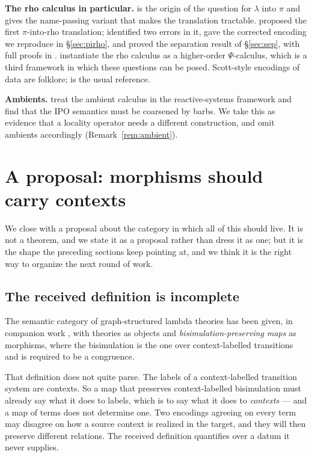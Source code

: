 \documentclass{article}
\begin{document}
\textbf{The rho calculus in particular.} \citet{funproc} is the origin of the question for $\lambda$ into $\pi$ and \citet{boudol} gives the name-passing variant that makes the translation tractable. \citet{rho} proposed the first $\pi$-into-rho translation; \citet{lybech} identified two errors in it, gave the corrected encoding we reproduce in \S\ref{sec:pirho}, and proved the separation result of \S\ref{sec:sep}, with full proofs in \citep{lybech-tr}. \citet{psi-rho} instantiate the rho calculus as a higher-order $\Psi$-calculus, which is a third framework in which these questions can be posed. Scott-style encodings of data are folklore; \citet{mogensen} is the usual reference.

\textbf{Ambients.} \citet{amb-ipo-lts-sos} treat the ambient calculus in the reactive-systems framework and find that the IPO semantics must be coarsened by barbs. We take this as evidence that a locality operator needs a different construction, and omit ambients accordingly (Remark~\ref{rem:ambient}).

\section{A proposal: morphisms should carry contexts}
\label{sec:cat-gslt}

We close with a proposal about the category in which all of this should live. It is not a theorem, and we state it as a proposal rather than dress it as one; but it is the shape the preceding sections keep pointing at, and we think it is the right way to organize the next round of work.

\subsection{The received definition is incomplete}

The semantic category of graph-structured lambda theories has been given, in companion work \citep{probing}, with theories as objects and \emph{bisimulation-preserving maps} as morphisms, where the bisimulation is the one over context-labelled transitions and is required to be a congruence.

That definition does not quite parse. The labels of a context-labelled transition system are contexts. So a map that preserves context-labelled bisimulation must already say what it does to labels, which is to say what it does to \emph{contexts} --- and a map of terms does not determine one. Two encodings agreeing on every term may disagree on how a source context is realized in the target, and they will then preserve different relations. The received definition quantifies over a datum it never supplies.
\end{document}
